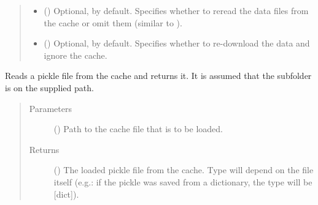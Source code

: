 \documentclass[letterpaper,10pt,english]{sphinxmanual}
\begin{document}
\begin{fulllineitems}
\begin{fulllineitems}
\begin{quote}
\begin{description}
\begin{itemize}
\item {} 
 () \textendash{} Optional,  by default. Specifies whether to reread
the data files from the cache or omit them (similar to
).

\item {} 
 () \textendash{} Optional,  by default. Specifies whether to
re-download the data and ignore the cache.

\end{itemize}

\end{description}\end{quote}

\end{fulllineitems}


\begin{fulllineitems}
\label{\detokenize{main:pypath.main.PyPath.read_from_cache}}
Reads a pickle file from the cache and returns it. It is assumed
that the subfolder  is on the supplied path.
\begin{quote}\begin{description}
\item[{Parameters}] \leavevmode
{} () \textendash{} Path to the cache file that is to be loaded.

\item[{Returns}] \leavevmode
() \textendash{} The loaded pickle file from the cache. Type will
depend on the file itself (e.g.: if the pickle was saved
from a dictionary, the type will be {[}dict{]}).

\end{description}\end{quote}

\end{fulllineitems}



\end{fulllineitems}
\end{document}
